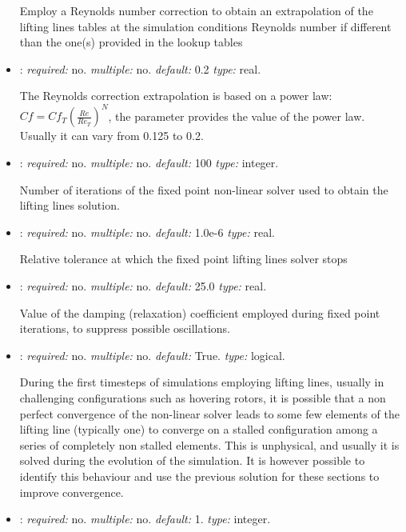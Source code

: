\begin{itemize}
Employ a Reynolds number correction to obtain an extrapolation of the lifting lines tables at the simulation conditions Reynolds number if different than the one(s) provided in the lookup tables

\item {}: \textit{required:} no. \textit{multiple:} no. \textit{default:} 0.2 \textit{type:} real.

The Reynolds correction extrapolation is based on a power law: $Cf = Cf_T \left(\frac{Re}{Re_T}\right)^N$, the parameter provides the value of the power law. Usually it can vary from 0.125 to 0.2.

\item {}: \textit{required:} no. \textit{multiple:} no. \textit{default:} 100 \textit{type:} integer.

Number of iterations of the fixed point non-linear solver used to obtain the lifting lines solution.

\item {}: \textit{required:} no. \textit{multiple:} no. \textit{default:} 1.0e-6 \textit{type:} real.

Relative tolerance at which the fixed point lifting lines solver stops

\item {}: \textit{required:} no. \textit{multiple:} no. \textit{default:} 25.0 \textit{type:} real.

Value of the damping (relaxation) coefficient employed during fixed point iterations, to suppress possible oscillations.

\item {}: \textit{required:} no. \textit{multiple:} no. \textit{default:} True. \textit{type:} logical.

During the first timesteps of simulations employing lifting lines, usually in challenging configurations such as hovering rotors, it is possible that a non perfect convergence of the non-linear solver leads to some few elements of the lifting line (typically one) to converge on a stalled configuration among a series of completely non stalled elements. This is unphysical, and usually it is solved during the evolution of the simulation. It is however possible to identify this behaviour and use the previous solution for these sections to improve convergence. 

\item {}: \textit{required:} no. \textit{multiple:} no. \textit{default:} 1. \textit{type:} integer.


\end{itemize}
